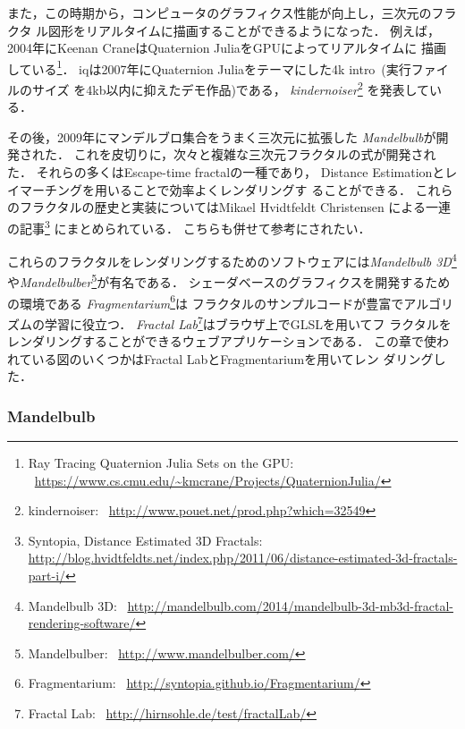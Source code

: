 また，この時期から，コンピュータのグラフィクス性能が向上し，三次元のフラクタ
ル図形をリアルタイムに描画することができるようになった．
例えば，2004年にKeenan CraneはQuaternion JuliaをGPUによってリアルタイムに
描画している\footnote{Ray Tracing Quaternion Julia Sets on
the GPU:
~\url{https://www.cs.cmu.edu/~kmcrane/Projects/QuaternionJulia/}}．
iqは2007年にQuaternion Juliaをテーマにした4k intro~(実行ファイルのサイズ
を4kb以内に抑えたデモ作品)である，
\textit{kindernoiser}\footnote{kindernoiser:
~\url{http://www.pouet.net/prod.php?which=32549}}
を発表している．

その後，2009年にマンデルブロ集合をうまく三次元に拡張した
\textit{Mandelbulb}が開発された．
これを皮切りに，次々と複雑な三次元フラクタルの式が開発された．
それらの多くはEscape-time fractalの一種であり，
Distance Estimationとレイマーチングを用いることで効率よくレンダリングす
ることができる．
これらのフラクタルの歴史と実装についてはMikael Hvidtfeldt Christensen
による一連の記事\footnote{Syntopia, Distance Estimated 3D Fractals:\\
\url{http://blog.hvidtfeldts.net/index.php/2011/06/distance-estimated-3d-fractals-part-i/}}
にまとめられている．
こちらも併せて参考にされたい．

これらのフラクタルをレンダリングするためのソフトウェアには\textit{Mandelbulb
3D}\footnote{Mandelbulb 3D:
~\url{http://mandelbulb.com/2014/mandelbulb-3d-mb3d-fractal-rendering-software/}}
や\textit{Mandelbulber}\footnote{Mandelbulber:
~\url{http://www.mandelbulber.com/}}が有名である．
シェーダベースのグラフィクスを開発するための環境である
\textit{Fragmentarium}\footnote{Fragmentarium:
~\url{http://syntopia.github.io/Fragmentarium/}}は
フラクタルのサンプルコードが豊富でアルゴリズムの学習に役立つ．
\textit{Fractal Lab}\footnote{Fractal Lab:
~\url{http://hirnsohle.de/test/fractalLab/}}はブラウザ上でGLSLを用いてフ
ラクタルをレンダリングすることができるウェブアプリケーションである．
この章で使われている図のいくつかはFractal LabとFragmentariumを用いてレン
ダリングした．

\subsubsection{Mandelbulb}

